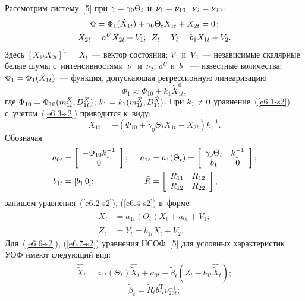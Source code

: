 \begin{multicols}{2}
Рассмотрим систему~[5] при $\gamma\hm=\gamma_0 \Theta_t$ и~$\nu_1\hm =\nu_{10}$, 
$\nu_2\hm = \nu_{20}$:
   \begin{gather}
   \Phi =\Phi_1 (\dot X_{1t}) + \gamma_0 \Theta_t X_{1t} + X_{2t} 
=0\,;\label{e6.1-s2}\\
\dot X_{2t} = a^U X_{2t} + V_1;\enskip Z_t=\dot Y_t = b_1 X_{1t} + 
V_2.\label{e6.2-s2}
\end{gather}
Здесь $[X_{1t} X_{2t}]^{\mathrm{T}}=X_t$~--- вектор состояния; $V_1$ и~$V_2$~--- независимые 
скалярные белые шумы с~интенсивностями~$\nu_1$ и~$\nu_2$; $a^U$ и~$b_1$~--- 
известные количества; $\Phi_1 \hm=\Phi_1 (\dot X_{1t})$~--- функция, допускающая 
регрессионную линеаризацию
   \begin{equation}
   \Phi_1 \approx \Phi_{10} + k_1 \dot X_{1t}^0,\label{e6.3-s2}
   \end{equation}
где $\Phi_{10} \hm=\Phi_{10} (m_{1t}^{\dot X}, D_{1t}^{\dot X})$; $k_1\hm= 
k_1(m_{1t}^{\dot X}, D_{1t}^{\dot X})$. При  $k_1\hm\ne 0$ уравнение~(\ref{e6.1-s2}) с~учетом~(\ref{e6.3-s2}) приводится к~виду:
   \begin{equation}
   \dot X_{1t} = -(\Phi_{10} + \gamma_0 \Theta_t  X_{1t} - X_{2t}) k_1^{-1}. 
\label{e6.4-s2}
\end{equation}
Обозначая
   \begin{alignat*}{2}
    a_{0t} &= \lk \begin{array}{c}
    -\Phi_{10} k_1^{-1}\\
    0
    \end{array}\rk; &\enskip
    a_{1t} &= a_1 (\Theta_t) = \lk \begin{array}{cc}
    \gamma_0 \Theta_t&k_1^{-1}\\
    b_1&0
    \end{array}\rk;
\\
b_{1t} &= [b_1\, 0]; &\enskip \tilde R &= \left[\begin{array}{cc}
    R_{11}& R_{12}\\
    R_{12}& R_{22}
    \end{array}\right],
    \end{alignat*}
запишем уравнения~(\ref{e6.2-s2}), (\ref{e6.4-s2}) в~форме
 \begin{align}
 \dot X_t &= a_{1t}(\Theta_t) X_t + a_{0t} + V_1;
 \label{e6.6-s2}
\\
Z_t &=\dot Y_t = b_{1t} X_t + V_2.
\label{e6.7-s2}
\end{align}
Для~(\ref{e6.6-s2}), (\ref{e6.7-s2}) уравнения НСОФ~[5] для условных характеристик УОФ имеют 
сле\-ду\-ющий вид:
    \begin{equation}
    \dot{\hat{\tilde X}}_t = a_{1t} (\Theta_t){\hat{\tilde X}}_t + a_{0t} 
+\tilde \beta_t (Z_t - b_{1t} {\hat{\tilde X}}_t);
\label{e6.8-s2}
\end{equation}
  \begin{equation}
  \tilde \beta_t =\tilde R_t b_{1t}^{\mathrm{T}} \nu_{20t}^{-1};
  \label{e6.9-s2}
  \end{equation}
  

\end{multicols}
